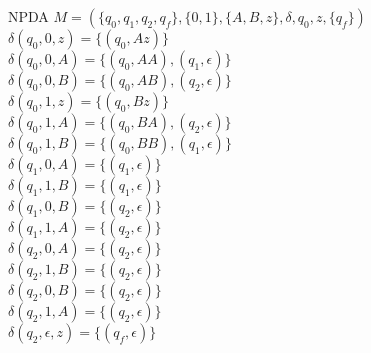 \documentclass[12pt]{article}
\begin{document}
\begin{enumerate}
\color{blue} NPDA $M = (\{q_0, q_1, q_2, q_f\}, \{0, 1\}, \{A, B, z\}, \delta, q_0, z, \{q_f\})$\\
$\delta(q_0, 0, z) = \{(q_0, Az)\}$\\
$\delta(q_0, 0, A) = \{(q_0, AA), (q_1, \epsilon)\}$\\
$\delta(q_0, 0, B) = \{(q_0, AB), (q_2, \epsilon)\}$\\
$\delta(q_0, 1, z) = \{(q_0, Bz)\}$\\
$\delta(q_0, 1, A) = \{(q_0, BA), (q_2, \epsilon)\}$\\
$\delta(q_0, 1, B) = \{(q_0, BB), (q_1, \epsilon)\}$\\
$\delta(q_1, 0, A) = \{(q_1, \epsilon)\}$\\
$\delta(q_1, 1, B) = \{(q_1, \epsilon)\}$\\
$\delta(q_1, 0, B) = \{(q_2, \epsilon)\}$\\
$\delta(q_1, 1, A) = \{(q_2, \epsilon)\}$\\
$\delta(q_2, 0, A) = \{(q_2, \epsilon)\}$\\
$\delta(q_2, 1, B) = \{(q_2, \epsilon)\}$\\
$\delta(q_2, 0, B) = \{(q_2, \epsilon)\}$\\
$\delta(q_2, 1, A) = \{(q_2, \epsilon)\}$\\
$\delta(q_2, \epsilon, z) = \{(q_f, \epsilon)\}$ \color{black}


\end{enumerate}
\end{document}
